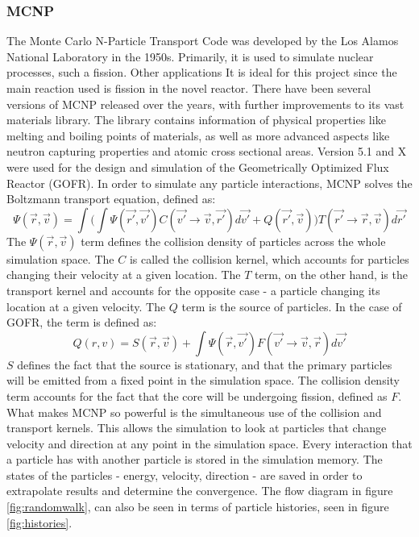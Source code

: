 \subsubsection{MCNP}
The Monte Carlo N-Particle Transport Code was developed by the Los Alamos National Laboratory in the 1950s. Primarily, it is used to simulate nuclear processes, such a fission. Other applications It is ideal for this project since the main reaction used is fission in the novel reactor. There have been several versions of MCNP released over the years, with further improvements to its vast materials library. The library contains information of physical properties like melting and boiling points of materials, as well as more advanced aspects like neutron capturing properties and atomic cross sectional areas. Version 5.1 and X were used for the design and simulation of the Geometrically Optimized Flux Reactor (GOFR). In order to simulate any particle interactions, MCNP solves the Boltzmann transport equation, defined as:
\begin{equation}
\Psi(\vec{r},\vec{v}) = \int\Big(\int\Psi(\vec{r'},\vec{v'})C(\vec{v'}\rightarrow \vec{v},\vec{r'})d\vec{v'} + Q(\vec{r'},\vec{v})\Big)T(\vec{r'}\rightarrow \vec{r},\vec{v})d\vec{r'}
\end{equation}
The $\Psi(\vec{r},\vec{v})$ term defines the collision density of particles across the whole simulation space. The $C$ is called the collision kernel, which accounts for particles changing their velocity at a given location. The $T$ term, on the other hand, is the transport kernel and accounts for the opposite case - a particle changing its location at a given velocity. The $Q$ term is the source of particles. In the case of GOFR, the term is defined as:
\begin{equation}
Q(r,v) = S(\vec{r},\vec{v}) + \int\Psi(\vec{r},\vec{v'})F(\vec{v'}\rightarrow \vec{v},\vec{r})d\vec{v'}
\end{equation}
$S$ defines the fact that the source is stationary, and that the primary particles will be emitted from a fixed point in the simulation space. The collision density term accounts for the fact that the core will be undergoing fission, defined as $F$. What makes MCNP so powerful is the simultaneous use of the collision and transport kernels. This allows the simulation to look at particles that change velocity and direction at any point in the simulation space. Every interaction that a particle has with another particle is stored in the simulation memory. The states of the particles - energy, velocity, direction - are saved in order to extrapolate results and determine the convergence. The flow diagram in figure \ref{fig:randomwalk}, can also be seen in terms of particle histories, seen in figure \ref{fig:histories}.

